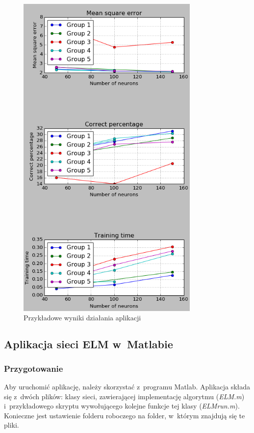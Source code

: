 \documentclass{article}
\begin{document}
\begin{figure}[H]
\centering
\includegraphics[width=0.8\textwidth]{instrukcja_python_end.png}
\caption{Przykładowe wyniki działania aplikacji}
\label{instrukcja_python_end}
\end{figure}
\clearpage
\subsection*{Aplikacja sieci ELM w~Matlabie}
\subsubsection*{Przygotowanie}
Aby uruchomić aplikację, należy skorzystać z~programu Matlab.
Aplikacja składa się z~dwóch plików: klasy sieci, zawierającej implementację algorytmu (\textit{ELM.m}) i~przykładowego skryptu wywołującego kolejne funkcje tej klasy (\textit{ELM\textunderscore run.m}).
Konieczne jest ustawienie folderu roboczego na folder, w~którym znajdują się te pliki.
\end{document}

